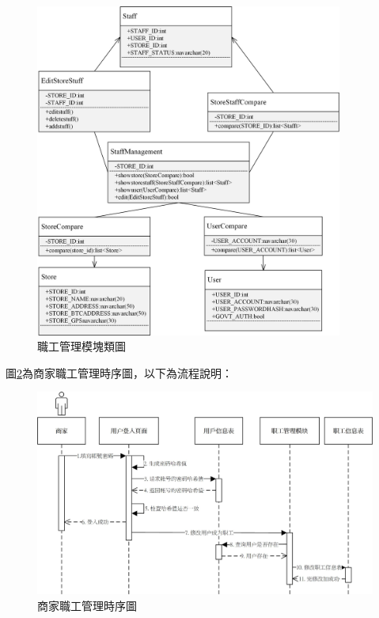 	\begin{figure}[htbp]
		\centering
		\includegraphics[width = 0.9\textwidth]{c1.jpg}
		\caption{職工管理模塊類圖}\label{c1}
	\end{figure}

	

	圖\ref{time2}為商家職工管理時序圖，以下為流程說明：

	\begin{figure}[htbp]
		\centering
		\includegraphics[width = 1\textwidth]{time2.jpg}
		\caption{商家職工管理時序圖}\label{time2}
	\end{figure}

